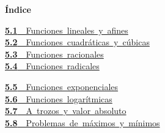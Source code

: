 \documentclass[11pt,a4paper]{article}
\begin{document}
\begin{tcolorbox}[colback=fmsurface,colframe=fmsurface,arc=3mm,left=4mm,right=4mm,top=2mm,bottom=2mm]
\small\textbf{Índice}\par\smallskip
\begin{minipage}[t]{0.49\linewidth}\small \mbox{\hyperlink{sec1}{\textbf{\color{fmgreen}5.1}\ \ Funciones lineales y afines}}\\[3pt]
\mbox{\hyperlink{sec2}{\textbf{\color{fmgreen}5.2}\ \ Funciones cuadráticas y cúbicas}}\\[3pt]
\mbox{\hyperlink{sec3}{\textbf{\color{fmgreen}5.3}\ \ Funciones racionales}}\\[3pt]
\mbox{\hyperlink{sec4}{\textbf{\color{fmgreen}5.4}\ \ Funciones radicales}}\\[3pt]\end{minipage}\hfill\begin{minipage}[t]{0.49\linewidth}\small \mbox{\hyperlink{sec5}{\textbf{\color{fmgreen}5.5}\ \ Funciones exponenciales}}\\[3pt]
\mbox{\hyperlink{sec6}{\textbf{\color{fmgreen}5.6}\ \ Funciones logarítmicas}}\\[3pt]
\mbox{\hyperlink{sec7}{\textbf{\color{fmgreen}5.7}\ \ A trozos y valor absoluto}}\\[3pt]
\mbox{\hyperlink{sec8}{\textbf{\color{fmgreen}5.8}\ \ Problemas de máximos y mínimos}}\\[3pt]\end{minipage}
\end{tcolorbox}

\Needspace{5.7cm}
\end{document}
